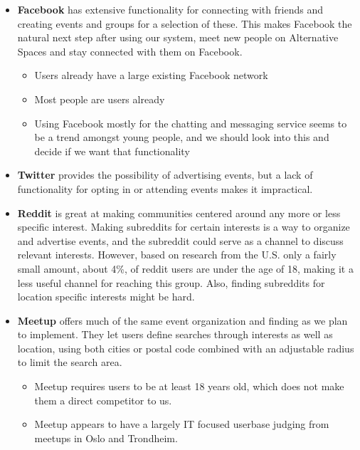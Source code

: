 \begin{itemize}
  \item \textbf{Facebook} has extensive functionality for connecting with friends and creating events and groups for a selection of these. This makes Facebook the natural next step after using our system, meet new people on Alternative Spaces and stay connected with them on Facebook. \begin{itemize}
    \item Users already have a large existing Facebook network
    \item Most people are users already
    \item Using Facebook mostly for the chatting and messaging service seems to be a trend amongst young people, and we should look into this and decide if we want that functionality
  \end{itemize}
  \item \textbf{Twitter} provides the possibility of advertising events, but a lack of functionality for opting in or attending events makes it impractical.
  \item \textbf{Reddit}  is great at making communities centered around any more or less specific interest. Making subreddits for certain interests is a way to organize and advertise events, and the subreddit could serve as a channel to discuss relevant interests. However, based on research from the U.S. only a fairly small amount, about 4\%, of reddit users are under the age of 18, making it a less useful channel for reaching this group. Also, finding subreddits for location specific interests might be hard.
  \item \textbf{Meetup} offers much of the same event organization and finding as we plan to implement. They let users define searches through interests as well as location, using both cities or postal code combined with an adjustable radius to limit the search area. \begin{itemize}
    \item Meetup requires users to be at least 18 years old, which does not make them a direct competitor to us.
    \item Meetup appears to have a largely IT focused userbase judging from meetups in Oslo and Trondheim.
  \end{itemize}
\end{itemize}

